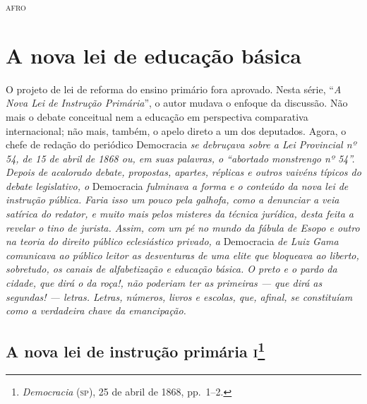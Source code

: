 \begin{flushright}
\textsc{afro}
\end{flushright}

\part{A nova lei de educação básica}

\begin{argumento}
O projeto de lei de reforma do ensino primário fora aprovado. Nesta
série, ``\emph{A Nova Lei de Instrução Primária}'', o autor mudava o
enfoque da discussão. Não mais o debate conceitual nem a educação em
perspectiva comparativa internacional; não mais, também, o apelo direto
a um dos deputados. Agora, o chefe de redação do periódico Democracia
\emph{se debruçava sobre a Lei Provincial nº 54, de 15 de abril de 1868 ou, em
suas palavras, o ``abortado monstrengo nº 54''. Depois de acalorado
debate, propostas, apartes, réplicas e outros vaivéns típicos do debate
legislativo, o} Democracia \emph{fulminava a forma e o conteúdo da nova
lei de instrução pública. Faria isso um pouco pela galhofa, como a
denunciar a veia satírica do redator, e muito mais pelos misteres da
técnica jurídica, desta feita a revelar o tino de jurista. Assim, com um
pé no mundo da fábula de Esopo e outro na teoria do direito público
eclesiástico privado, a} Democracia \emph{de Luiz Gama comunicava ao
público leitor as desventuras de uma elite que bloqueava ao liberto,
sobretudo, os canais de alfabetização e educação básica. O preto e o
pardo da cidade, que dirá o da roça!, não poderiam ter as primeiras ---
que dirá as segundas! --- letras. Letras, números, livros e escolas, que,
afinal, se constituíam como a verdadeira chave da emancipação.}
\end{argumento}

\chapter{A nova lei de instrução primária \textsc{i}\footnote{\emph{Democracia} (\textsc{sp}), 25 de abril de 1868, pp.~1--2.}}

